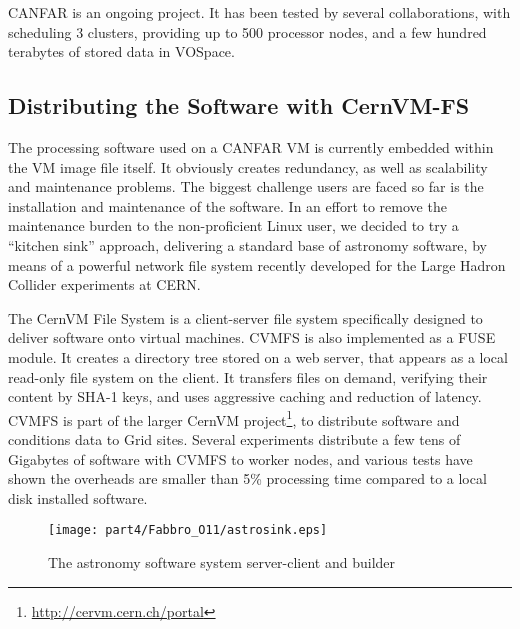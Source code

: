 CANFAR is an ongoing project. It has been tested by several collaborations, with scheduling 3 clusters, providing up to 500 processor nodes, and a few hundred terabytes of stored data in VOSpace.

\subsection{Distributing the Software with CernVM-FS}
The processing software used on a CANFAR VM is currently embedded within the VM image file itself. It obviously creates redundancy, as well as scalability and maintenance problems. The biggest challenge users are faced so far is the installation and maintenance of the software. In an effort to remove the maintenance burden to the non-proficient Linux user, we decided to try a ``kitchen sink'' approach, delivering a standard base of astronomy software, by means of a powerful network file system recently developed for the Large Hadron Collider experiments at CERN.

The CernVM File System \citep[CVMFS,][]{blomer11} is a client-server file system specifically designed to deliver software onto virtual machines. CVMFS is also implemented as a FUSE module. It creates a directory tree stored on a web server, that appears as a local read-only file system on the client. It transfers files on demand, verifying their content by SHA-1 keys, and uses aggressive caching and reduction of latency. CVMFS is part of the larger CernVM project\footnote{\url{http://cervm.cern.ch/portal}}, to distribute software and conditions data to Grid sites. Several experiments distribute a few tens of Gigabytes of software with CVMFS to worker nodes, and various tests have shown the overheads are smaller than 5\% processing time compared to a local disk installed software.

\begin{center}
  \begin{figure}
    \texttt{[image: part4/Fabbro\_O11/astrosink.eps]}
    \caption{The astronomy software system server-client and builder}
  \end{figure}  
\end{center}


